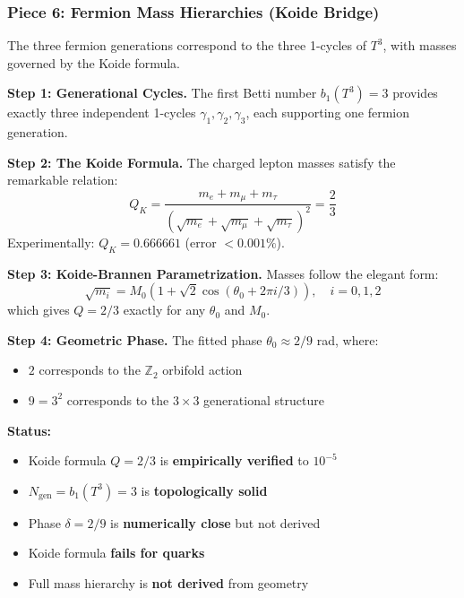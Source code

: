 \documentclass[12pt,a4paper]{article}
\newcommand{\Ztwo}{\mathbb{Z}_2}
\begin{document}
\subsubsection{Piece 6: Fermion Mass Hierarchies (Koide Bridge)}

The three fermion generations correspond to the three 1-cycles of $T^3$, with masses governed by the Koide formula.

\textbf{Step 1: Generational Cycles.}
The first Betti number $b_1(T^3) = 3$ provides exactly three independent 1-cycles $\gamma_1, \gamma_2, \gamma_3$, each supporting one fermion generation.

\textbf{Step 2: The Koide Formula.}
The charged lepton masses satisfy the remarkable relation:
\begin{equation}
Q_K = \frac{m_e + m_\mu + m_\tau}{(\sqrt{m_e} + \sqrt{m_\mu} + \sqrt{m_\tau})^2} = \frac{2}{3}
\end{equation}
Experimentally: $Q_K = 0.666661$ (error $< 0.001\%$).

\textbf{Step 3: Koide-Brannen Parametrization.}
Masses follow the elegant form:
\begin{equation}
\sqrt{m_i} = M_0(1 + \sqrt{2}\cos(\theta_0 + 2\pi i/3)), \quad i = 0,1,2
\end{equation}
which gives $Q = 2/3$ exactly for any $\theta_0$ and $M_0$.

\textbf{Step 4: Geometric Phase.}
The fitted phase $\theta_0 \approx 2/9$ rad, where:
\begin{itemize}[itemsep=0pt]
    \item $2$ corresponds to the $\Ztwo$ orbifold action
    \item $9 = 3^2$ corresponds to the $3 \times 3$ generational structure
\end{itemize}

\textbf{Status:}
\begin{itemize}[itemsep=0pt]
    \item[\checkmark] Koide formula $Q = 2/3$ is \textbf{empirically verified} to $10^{-5}$
    \item[\checkmark] $N_{\text{gen}} = b_1(T^3) = 3$ is \textbf{topologically solid}
    \item[$\sim$] Phase $\delta = 2/9$ is \textbf{numerically close} but not derived
    \item[$\times$] Koide formula \textbf{fails for quarks}
    \item[$\times$] Full mass hierarchy is \textbf{not derived} from geometry
\end{itemize}
\end{document}

